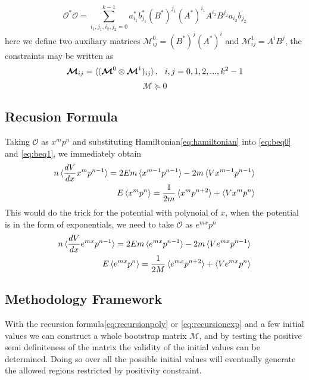 \documentclass[aps, preprint,amsmath, amssymb]{revtex4-2}
\begin{document}
\begin{equation}
    \mathcal{O}^* \mathcal{O} = \sum_{i_1, j_1, i_2, j_2 = 0}^{k - 1} a_{i_1}^* b_{j_1}^* (B^*)^{j_1} (A^*)^{i_1} A^{i_2} B^{j_2} a_{i_2} b_{j_2}
\end{equation}
here we define two auxiliary matrices $\bm{\mathcal{M}}_{ij}^0 = (B^*)^j (A^*)^i$ and $\bm{\mathcal{M}}_{ij}^1 = A^i B^j$, the constraints may be written as
\begin{equation}
    \bm{\mathcal{M}}_{ij} = \braket{(\bm{\mathcal{M}}^0 \otimes \bm{\mathcal{M}}^1)_{ij}}, \ \ i, j = 0, 1, 2, ..., k^2 - 1
\end{equation}
\begin{equation}
    \bm{\mathcal{M}} \succeq 0
\end{equation}

\subsection{Recusion Formula}
Taking $\mathcal{O}$ as $x^m p^n$ and substituting Hamiltonian\eqref{eq:hamiltonian} into \eqref{eq:beq0} and \eqref{eq:beq1}, we immediately obtain
\begin{align}
    n \braket{\frac{d V}{d x} x^m p^{n - 1}} = 2E m \braket{x^{m - 1} p^{n - 1}} - 2m\braket{V x^{m - 1} p^{n - 1}} \notag \\ 
    E\braket{x^m p^n} = \frac1{2m}\braket{x^m p^{n + 2}} + \braket{V x^m p^n} \label{eq:recursionpoly}
\end{align}
This would do the trick for the potential with polynoial of $x$, when the potential is in the form of exponentials, we need to take $\mathcal{O}$ as $e^{mx} p^n$ 
\begin{align}
    n \braket{\frac{d V}{d x} e^{m x} p^{n - 1}} = 2Em\braket{e^{mx} p^{n - 1}} - 2m\braket{V e^{mx} p^{n - 1}}\notag \\ 
    E \braket{e^{mx} p^n} = \frac1{2M}\braket{e^{mx} p^{n + 2}} + \braket{Ve^{mx} p^n} \label{eq:recursionexp}
\end{align}

\subsection{Methodology Framework}
With the recursion formula\eqref{eq:recursionpoly} or \eqref{eq:recursionexp} and a few initial values we can construct a whole bootstrap matrix $\bm{\mathcal{M}}$, and by testing the positive semi definiteness of the matrix the validity of the initial values can be determined. Doing so over all the possible initial values will eventually generate the allowed regions restricted by positivity constraint. 
\end{document}
